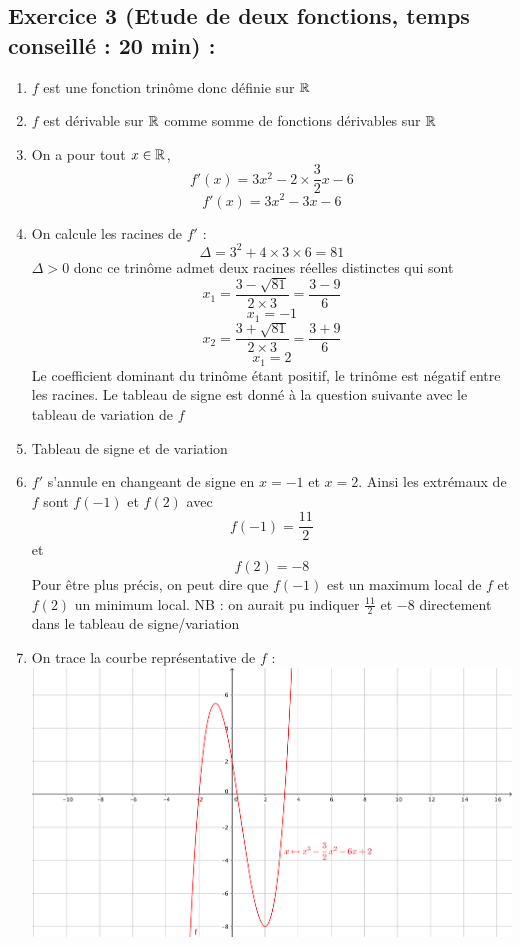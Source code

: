 \subsection*{Exercice 3 (Etude de deux fonctions, temps conseillé : 20 min) : }
\begin{enumerate}
\item $f$ est une fonction trinôme donc définie sur $\mathbb{R}$
\item $f$ est dérivable sur $\mathbb{R}$ comme somme de fonctions dérivables sur $\mathbb{R}$
\item On a pour tout $x\in \mathbb{R}$, 
$$f'(x) = 3x^2 - 2\times \frac{3}{2}x -6$$
$$\boxed{f'(x) = 3x^2 - 3x - 6}$$
\item On calcule les racines de $f'$ : $$\Delta  = 3^2 + 4\times 3\times6 = 81$$ $\Delta > 0$ donc ce trinôme admet deux racines réelles distinctes qui sont 
$$x_1 = \frac{3 - \sqrt{81}}{2\times 3} = \frac{3-9}{6}$$
$$\boxed{x_1 = -1}$$
$$x_2 = \frac{3 + \sqrt{81}}{2\times 3} = \frac{3+9}{6}$$
$$\boxed{x_1 = 2}$$
Le coefficient dominant du trinôme étant positif, le trinôme est négatif entre les racines. Le tableau de signe est donné à la question suivante avec le tableau de variation de $f$
\item Tableau de signe et de variation \newline
{}
\item $f'$ s'annule en changeant de signe en $x=-1$ et $x=2$. Ainsi les extrémaux de $f$ sont $f(-1)$ et $f(2)$ avec $$\boxed{f(-1) = \frac{11}{2}}$$ et $$\boxed{f(2) = -8}$$ Pour être plus précis, on peut dire que $f(-1)$ est un maximum local de $f$ et $f(2)$ un minimum local. NB : on aurait pu indiquer $\frac{11}{2}$ et $-8$ directement dans le tableau de signe/variation
\item On trace la courbe représentative de $f$ : \newline
\includegraphics[scale=0.5]{chap3_corr_ill1.png}

\end{enumerate}
